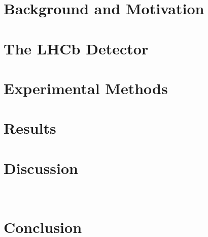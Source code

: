 \documentclass[10pt]{report}
\begin{document}
\newpage
\tableofcontents

\setlength{\parskip}{1em}
\renewcommand{\baselinestretch}{1.5}

\newpage

\chapter{Background and Motivation}


\chapter{The LHCb Detector}

\chapter{Experimental Methods}

\chapter{Results}
\chapter{Discussion}
\



\newpage

\chapter*{Conclusion}



\footnotesize
%
%
\end{document}
